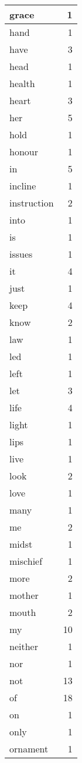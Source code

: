 \begin{center}
\begin{longtable}{l|r}
grace & 1\\ \hline 
hand & 1\\ \hline 
have & 3\\ \hline 
head & 1\\ \hline 
health & 1\\ \hline 
heart & 3\\ \hline 
her & 5\\ \hline 
hold & 1\\ \hline 
honour & 1\\ \hline 
in & 5\\ \hline 
incline & 1\\ \hline 
instruction & 2\\ \hline 
into & 1\\ \hline 
is & 1\\ \hline 
issues & 1\\ \hline 
it & 4\\ \hline 
just & 1\\ \hline 
keep & 4\\ \hline 
know & 2\\ \hline 
law & 1\\ \hline 
led & 1\\ \hline 
left & 1\\ \hline 
let & 3\\ \hline 
life & 4\\ \hline 
light & 1\\ \hline 
lips & 1\\ \hline 
live & 1\\ \hline 
look & 2\\ \hline 
love & 1\\ \hline 
many & 1\\ \hline 
me & 2\\ \hline 
midst & 1\\ \hline 
mischief & 1\\ \hline 
more & 2\\ \hline 
mother & 1\\ \hline 
mouth & 2\\ \hline 
my & 10\\ \hline 
neither & 1\\ \hline 
nor & 1\\ \hline 
not & 13\\ \hline 
of & 18\\ \hline 
on & 1\\ \hline 
only & 1\\ \hline 
ornament & 1\\ \hline 

\end{longtable}
\end{center}
